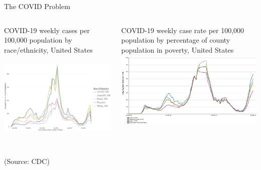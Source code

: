\begin{slide}{The COVID Problem}
	\centering
	\begin{columns}[T]
		\begin{column}{.5\textwidth}
			\centering
			COVID-19 weekly cases per 100,000 population by race/ethnicity, United States
			\includegraphics[height=4.5cm]{images/ethnicity-trends}
		\end{column}
		\begin{column}{.5\textwidth}
			\centering
			COVID-19 weekly case rate per 100,000 population by percentage of county population in poverty, United States
			\includegraphics[height=3.7cm]{images/poverty-trends}
		\end{column}
	\end{columns}
	{\tiny (Source: CDC)}
\end{slide}